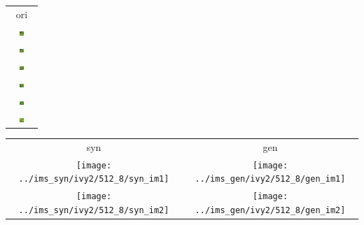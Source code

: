 \documentclass[letter]{article}
\begin{document}
\newpage

\begin{table}[h!]
	\centering
	\begin{tabular}{c}
		ori\tabularnewline
		\includegraphics[width=0.17\textwidth]{../data/ivy2/512/1} \tabularnewline		\includegraphics[width=0.17\textwidth]{../data/ivy2/512/2} \tabularnewline		\includegraphics[width=0.17\textwidth]{../data/ivy2/512/3} \tabularnewline		\includegraphics[width=0.17\textwidth]{../data/ivy2/512/4} \tabularnewline		\includegraphics[width=0.17\textwidth]{../data/ivy2/512/5} \tabularnewline		\includegraphics[width=0.17\textwidth]{../data/ivy2/512/6} \tabularnewline
	\end{tabular}
	\begin{tabular}{cc}
		syn & gen\tabularnewline
		\texttt{[image: ../ims\_syn/ivy2/512\_8/syn\_im1]} & \texttt{[image: ../ims\_gen/ivy2/512\_8/gen\_im1]} \tabularnewline
		\texttt{[image: ../ims\_syn/ivy2/512\_8/syn\_im2]} & \texttt{[image: ../ims\_gen/ivy2/512\_8/gen\_im2]} \tabularnewline

\end{tabular}
\end{table}
\end{document}
